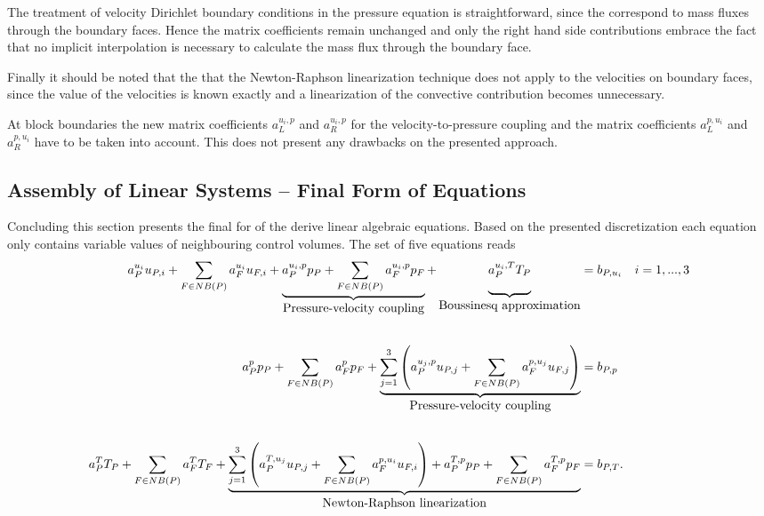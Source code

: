 The treatment of velocity Dirichlet boundary conditions in the pressure equation is straightforward, since the correspond to mass fluxes through the boundary faces. Hence the matrix coefficients remain unchanged and only the right hand side contributions embrace the fact that no implicit interpolation is necessary to calculate the mass flux through the boundary face.

Finally it should be noted that the that the Newton-Raphson linearization technique does not apply to the velocities on boundary faces, since the value of the velocities is known exactly and a linearization of the convective contribution becomes unnecessary.


At block boundaries the new matrix coefficients \(a_L^{u_i,p}\) and \(a_R^{u_i,p}\) for the velocity-to-pressure coupling and the matrix coefficients \(a_L^{p,u_i}\) and \(a_R^{p,u_i}\) have to be taken into account. This does not present any drawbacks on the presented approach.

\subsection{Assembly of Linear Systems -- Final Form of Equations}

Concluding this section presents the final for of the derive linear algebraic equations. Based on the presented discretization each equation only contains variable values of neighbouring control volumes. The set of five equations reads
\begin{align}
  a_P^{u_i} u_{P,i} + \sum_{F \in NB(P)} a_F^{u_i} u_{F,i} + \underbrace{\vphantom{\sum_F}{a_P^{u_i,p} p_P+ \sum_{F \in NB(P)} a_F^{u_i,p} p_F}}_{\hbox{Pressure-velocity coupling}} + \underbrace{\vphantom{\sum_F}{ a_P^{u_i,T} T_P}}_{\hbox{Boussinesq approximation}} &= b_{P,u_i} \quad i=1,...,3  \\[2.0em]
  a_P^{p} p_{P} + \sum_{F \in NB(P)} a_F^{p} p_F + \underbrace{ \sum_{j=1}^3 \left(a_P^{u_j,p} u_{P,j}+ \sum_{F \in NB(P)} a_F^{p,u_j} u_{F,j} \right)}_{\hbox{Pressure-velocity coupling}} &= b_{P,p}  \\[2.0em]
  a_P^{T} T_{P} + \sum_{F \in NB(P)} a_F^{T} T_F + \underbrace{\sum_{j=1}^3 \left(a_P^{T,u_j} u_{P,j}+ \sum_{F \in NB(P)} a_F^{p,u_i} u_{F,i} \right) + a_P^{T,p} p_P + \sum_{F \in NB(P) } a_F^{T,p} p_F}_{\hbox{Newton-Raphson linearization}} &= b_{P,T}.
\end{align}


